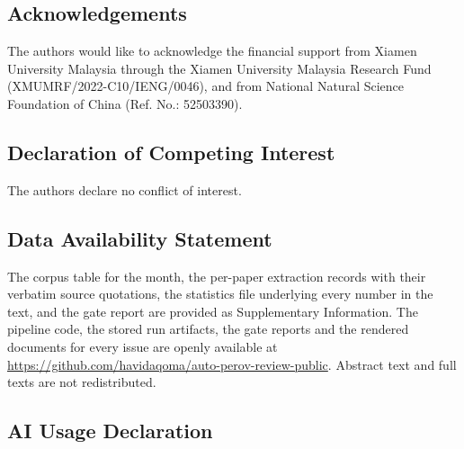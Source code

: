 \documentclass[
  11pt,
]{article}
\begin{document}
\subsection{Acknowledgements}\label{acknowledgements}

The authors would like to acknowledge the financial support from Xiamen
University Malaysia through the Xiamen University Malaysia Research Fund
(XMUMRF/2022-C10/IENG/0046), and from National Natural Science
Foundation of China (Ref. No.: 52503390).

\subsection{Declaration of Competing
Interest}\label{declaration-of-competing-interest}

The authors declare no conflict of interest.

\subsection{Data Availability
Statement}\label{data-availability-statement}

The corpus table for the month, the per-paper extraction records with
their verbatim source quotations, the statistics file underlying every
number in the text, and the gate report are provided as Supplementary
Information. The pipeline code, the stored run artifacts, the gate
reports and the rendered documents for every issue are openly available
at \url{https://github.com/havidaqoma/auto-perov-review-public}.
Abstract text and full texts are not redistributed.

\subsection{AI Usage Declaration}\label{ai-usage-declaration}
\end{document}

